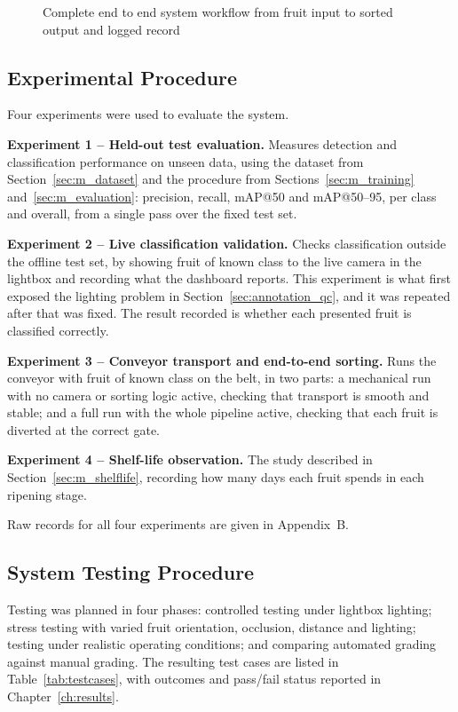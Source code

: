 \begin{figure}[H]
\centering
{}
\caption{Complete end to end system workflow from fruit input to sorted output and logged record}
\label{fig:workflow}
\end{figure}

\subsection{Experimental Procedure}
\label{sec:m_experiments}

Four experiments were used to evaluate the system.

\textbf{Experiment 1 -- Held-out test evaluation.} Measures detection and classification performance on unseen data, using the dataset from Section~\ref{sec:m_dataset} and the procedure from Sections~\ref{sec:m_training} and~\ref{sec:m_evaluation}: precision, recall, mAP@50 and mAP@50--95, per class and overall, from a single pass over the fixed test set.

\textbf{Experiment 2 -- Live classification validation.} Checks classification outside the offline test set, by showing fruit of known class to the live camera in the lightbox and recording what the dashboard reports. This experiment is what first exposed the lighting problem in Section~\ref{sec:annotation_qc}, and it was repeated after that was fixed. The result recorded is whether each presented fruit is classified correctly.

\textbf{Experiment 3 -- Conveyor transport and end-to-end sorting.} Runs the conveyor with fruit of known class on the belt, in two parts: a mechanical run with no camera or sorting logic active, checking that transport is smooth and stable; and a full run with the whole pipeline active, checking that each fruit is diverted at the correct gate.

\textbf{Experiment 4 -- Shelf-life observation.} The study described in Section~\ref{sec:m_shelflife}, recording how many days each fruit spends in each ripening stage.

Raw records for all four experiments are given in Appendix~B.

\subsection{System Testing Procedure}
\label{sec:m_testing}

Testing was planned in four phases: controlled testing under lightbox lighting; stress testing with varied fruit orientation, occlusion, distance and lighting; testing under realistic operating conditions; and comparing automated grading against manual grading. The resulting test cases are listed in Table~\ref{tab:testcases}, with outcomes and pass/fail status reported in Chapter~\ref{ch:results}.

